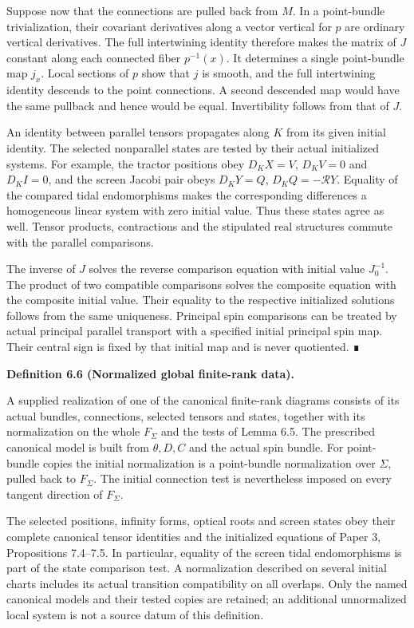 \documentclass[
  english,
  11pt,
  reqno]{amsart}
\makeatletter
\newcommand{\pandocstatementheading}[1]{%
  \par\addpenalty{\@beginparpenalty}%
  \addvspace{.5\baselineskip plus .2\baselineskip minus .2\baselineskip}%
  {\normalfont\bfseries #1\par}%
  \nobreak\@afterindenttrue\@afterheading
}
\makeatother
\begin{document}
Suppose now that the connections are pulled back from \(M\). In a
point-bundle trivialization, their covariant derivatives along a vector
vertical for \(p\) are ordinary vertical derivatives. The full
intertwining identity therefore makes the matrix of \(J\) constant along
each connected fiber \(p^{-1}(x)\). It determines a single point-bundle
map \(j_x\). Local sections of \(p\) show that \(j\) is smooth, and the
full intertwining identity descends to the point connections. A second
descended map would have the same pullback and hence would be equal.
Invertibility follows from that of \(J\).

An identity between parallel tensors propagates along \(K\) from its
given initial identity. The selected nonparallel states are tested by
their actual initialized systems. For example, the tractor positions
obey \(D_KX=V\), \(D_KV=0\) and \(D_KI=0\), and the screen Jacobi pair
obeys \(D_KY=Q\), \(D_KQ=-\mathcal RY\). Equality of the compared tidal
endomorphisms makes the corresponding differences a homogeneous linear
system with zero initial value. Thus these states agree as well. Tensor
products, contractions and the stipulated real structures commute with
the parallel comparisons.

The inverse of \(J\) solves the reverse comparison equation with initial
value \(J_0^{-1}\). The product of two compatible comparisons solves the
composite equation with the composite initial value. Their equality to
the respective initialized solutions follows from the same uniqueness.
Principal spin comparisons can be treated by actual principal parallel
transport with a specified initial principal spin map. Their central
sign is fixed by that initial map and is never quotiented. ∎

\pandocstatementheading{\protect{}\label{def:global-normalized-finite-rank-data}Definition 6.6 (Normalized global finite-rank data).}

A supplied realization of one of the canonical finite-rank diagrams
consists of its actual bundles, connections, selected tensors and
states, together with its normalization on the whole \(F_\Sigma\) and
the tests of Lemma 6.5. The prescribed canonical model is built from
\(\theta,D,C\) and the actual spin bundle. For point-bundle copies the
initial normalization is a point-bundle normalization over \(\Sigma\),
pulled back to \(F_\Sigma\). The initial connection test is nevertheless
imposed on every tangent direction of \(F_\Sigma\).

The selected positions, infinity forms, optical roots and screen states
obey their complete canonical tensor identities and the initialized
equations of Paper 3, Propositions 7.4--7.5. In particular, equality of
the screen tidal endomorphisms is part of the state comparison test. A
normalization described on several initial charts includes its actual
transition compatibility on all overlaps. Only the named canonical
models and their tested copies are retained; an additional unnormalized
local system is not a source datum of this definition.
\end{document}
